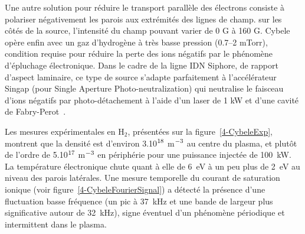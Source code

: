 \begin{refsection}
{Une autre solution pour réduire
le transport parallèle des électrons consiste à polariser négativement les
parois aux extrémités des lignes de champ.} sur les côtés de la source,
l'intensité du champ pouvant varier de 0 G à 160 G. Cybele opère enfin avec un
gaz d'hydrogène à très basse pression (0.7--2 mTorr), condition
requise pour réduire la perte des ions négatifs par le phénomène d'épluchage
électronique. Dans le cadre de la
ligne IDN Siphore, de rapport d'aspect laminaire, ce type de
source s'adapte parfaitement à l'accélérateur Singap (pour Single Aperture
Photo-neutralization) qui neutralise le faisceau d'ions négatifs
par photo-détachement à l'aide d'un laser de 1 kW et d'une cavité de
Fabry-Perot~\parencite{SimoninHDR}.

Les mesures expérimentales en H$_2$, présentées sur la figure~\ref{4-CybeleExp},
montrent que la densité est d'environ 3.10$^{{18}}$ m$^{{-3}}$ au
centre du plasma, et plutôt de l'ordre de 5.10$^{{17}}$ m$^{{-3}}$
en périphérie pour une puissance injectée de 100~kW.
La température électronique chute quant à elle de 6~eV à un peu plus de 2~eV au
niveau des parois latérales. Une mesure temporelle du courant de saturation ionique (voir
figure~\ref{4-CybeleFourierSignal}) a détecté la présence d'une
fluctuation basse fréquence (un pic à 37~kHz et une bande de
largeur plus significative autour de 32~kHz), signe éventuel d'un phénomène
périodique et intermittent dans le plasma.


\end{refsection}
